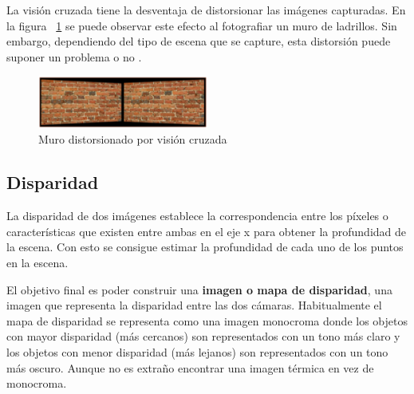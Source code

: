 La visión cruzada tiene la desventaja de distorsionar las imágenes capturadas.
En la figura ~\ref{fig:VisionCruzadaMuro} se puede observar este efecto al
fotografiar un muro de ladrillos. Sin embargo, dependiendo del tipo de escena
que se capture, esta distorsión puede suponer un problema o no \cite{Geometria}.

\begin{figure}[!th]
  \begin{center}
    \includegraphics[width=0.5\textwidth]{images/cap2/VisionCruzadaMuro.eps}
    \caption{Muro distorsionado por visión cruzada}
    \label{fig:VisionCruzadaMuro}
  \end{center}
\end{figure}




\subsection{Disparidad}
\label{subsec:Disparidad}

La disparidad de dos imágenes establece la correspondencia entre los píxeles o
características que existen entre ambas en el eje x para obtener la profundidad
de la escena. Con esto se consigue estimar la profundidad de cada uno de los
puntos en la escena.

El objetivo final es poder construir una \textbf{imagen o mapa de disparidad},
una imagen que representa la disparidad entre las dos cámaras. Habitualmente
el mapa de disparidad se representa como una imagen monocroma donde los objetos
con mayor disparidad (más cercanos) son representados con un tono más claro y
los objetos con menor disparidad (más lejanos) son representados con un tono más
oscuro. Aunque no es extraño encontrar una imagen térmica en vez de monocroma.

